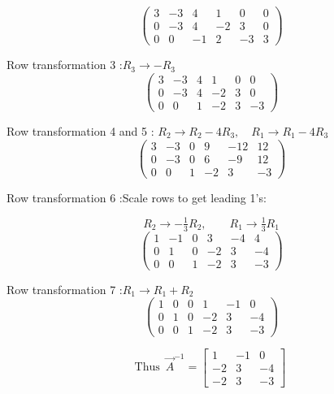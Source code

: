 \documentclass{beamer}
\begin{document}
\begin{frame}
\[
\left(
\begin{array}{ccc|ccc}
3 & -3 & 4 & 1 & 0 & 0 \\[4pt]
0 & -3 & 4 & -2 & 3 & 0 \\[4pt]
0 & 0 & -1 & 2 & -3 & 3
\end{array}
\right)
\]

Row transformation 3 :\quad $R_3 \to -R_3$
\[
\left(
\begin{array}{ccc|ccc}
3 & -3 & 4 & 1 & 0 & 0 \\[4pt]
0 & -3 & 4 & -2 & 3 & 0 \\[4pt]
0 & 0 & 1 & -2 & 3 & -3
\end{array}
\right)
\]

Row transformation 4 and 5 :\quad
$R_2 \to R_2 - 4R_3,\quad R_1 \to R_1 - 4R_3$
\[
\left(
\begin{array}{ccc|ccc}
3 & -3 & 0 & 9 & -12 & 12 \\[4pt]
0 & -3 & 0 & 6 & -9 & 12 \\[4pt]
0 & 0 & 1 & -2 & 3 & -3
\end{array}
\right)
\]

Row transformation 6 :\quad Scale rows to get leading 1's:
\end{frame}
\begin{frame}
\[
R_2 \to -\tfrac{1}{3}R_2,\qquad R_1 \to \tfrac{1}{3}R_1
\]
\[
\left(
\begin{array}{ccc|ccc}
1 & -1 & 0 & 3 & -4 & 4 \\[4pt]
0 & 1 & 0 & -2 & 3 & -4 \\[4pt]
0 & 0 & 1 & -2 & 3 & -3
\end{array}
\right)
\]

Row transformation 7 :\quad $R_1 \to R_1 + R_2$
\[
\left(
\begin{array}{ccc|ccc}
1 & 0 & 0 & 1 & -1 & 0 \\[4pt]
0 & 1 & 0 & -2 & 3 & -4 \\[4pt]
0 & 0 & 1 & -2 & 3 & -3
\end{array}
\right)
\]

\[
\text{Thus }
\boxed{\,\vec{A}^{-1} =
\begin{bmatrix}
1 & -1 & 0\\[4pt]
-2 & 3 & -4\\[4pt]
-2 & 3 & -3
\end{bmatrix}\,}
\]
\end{frame}
\end{document}
